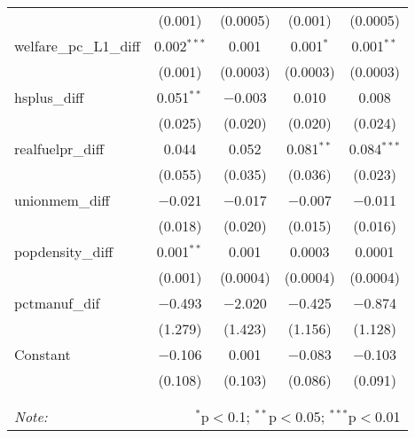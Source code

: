 \begin{table}[!htbp]
\begin{tabular}{@{\extracolsep{5pt}}lcccc}
  & (0.001) & (0.0005) & (0.001) & (0.0005) \\ 
  welfare\_pc\_L1\_diff & 0.002$^{***}$ & 0.001 & 0.001$^{*}$ & 0.001$^{**}$ \\ 
  & (0.001) & (0.0003) & (0.0003) & (0.0003) \\ 
  hsplus\_diff & 0.051$^{**}$ & $-$0.003 & 0.010 & 0.008 \\ 
  & (0.025) & (0.020) & (0.020) & (0.024) \\ 
  realfuelpr\_diff & 0.044 & 0.052 & 0.081$^{**}$ & 0.084$^{***}$ \\ 
  & (0.055) & (0.035) & (0.036) & (0.023) \\ 
  unionmem\_diff & $-$0.021 & $-$0.017 & $-$0.007 & $-$0.011 \\ 
  & (0.018) & (0.020) & (0.015) & (0.016) \\ 
  popdensity\_diff & 0.001$^{**}$ & 0.001 & 0.0003 & 0.0001 \\ 
  & (0.001) & (0.0004) & (0.0004) & (0.0004) \\ 
  pctmanuf\_dif & $-$0.493 & $-$2.020 & $-$0.425 & $-$0.874 \\ 
  & (1.279) & (1.423) & (1.156) & (1.128) \\ 
  Constant & $-$0.106 & 0.001 & $-$0.083 & $-$0.103 \\ 
  & (0.108) & (0.103) & (0.086) & (0.091) \\ 
 \hline \\[-1.8ex] 
\hline 
\hline \\[-1.8ex] 
\textit{Note:}  & \multicolumn{4}{r}{$^{*}$p$<$0.1; $^{**}$p$<$0.05; $^{***}$p$<$0.01} \\ 
\end{tabular} 
\end{table} 
